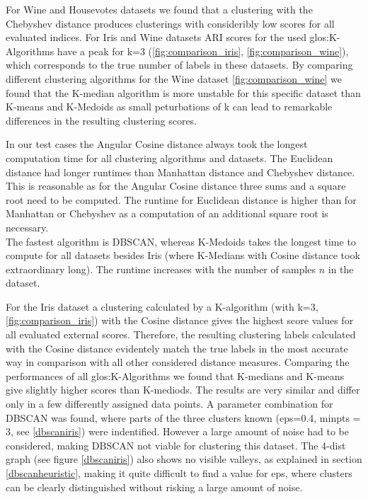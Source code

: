 


For Wine and Housevotes datasets we found that a clustering with the Chebyshev distance produces clusterings with consideribly low scores for all evaluated indices. 
For Iris and Wine datasets ARI scores for the used \Gls{glos:K-Algorithms} have a peak for k=3 (\autoref{fig:comparison_iris}, \autoref{fig:comparison_wine}), which corresponds to the true number of labels in these datasets.  
By comparing different clustering algorithms for the Wine dataset \autoref{fig:comparison_wine} we found that the K-median algorithm is more unstable for this specific dataset than K-means and K-Medoids as small peturbations of k can lead to remarkable differences in the resulting clustering scores. 

In our test cases the Angular Cosine distance always took the longest computation time for all clustering algorithms and datasets. The Euclidean distance had longer runtimes than Manhattan distance and Chebyshev distance. This is reasonable as for the Angular Cosine distance three sums and a square root need to be computed. The runtime for Euclidean distance is higher than for Manhattan or Chebyshev as a computation of an additional square root is necessary.\\
The fastest algorithm is DBSCAN, whereas K-Medoids takes the longest time to compute for all datasets besides Iris (where K-Medians with Cosine distance took extraordinary long). The runtime increases with the number of samples $n$ in the dataset. 

For the Iris dataset a clustering calculated by a K-algorithm (with k=3, \autoref{fig:comparison_iris}) with the Cosine distance gives the highest score values for all evaluated external scores. Therefore, the resulting clustering labels calculated with the Cosine distance evidentely match the true labels in the most accurate way in comparison with all other considered distance measures. Comparing the performances of all \Gls{glos:K-Algorithms} we found that K-medians and K-means give slightly higher scores than K-mediods. The results are very similar and differ only in a few differently assigned data points.
A parameter combination for DBSCAN was found, where parts of the three clusters known (eps=0.4, minpts = 3, see \autoref{dbscaniris}) were indentified. However a large amount of noise had to be considered, making DBSCAN not viable for clustering this dataset. The 4-dist graph (see figure \autoref{dbscaniris}) also shows no visible valleys, as explained in section \ref{dbscanheuristic}, making it quite difficult to find a value for eps, where clusters can be clearly distinguished without risking a large amount of noise.

